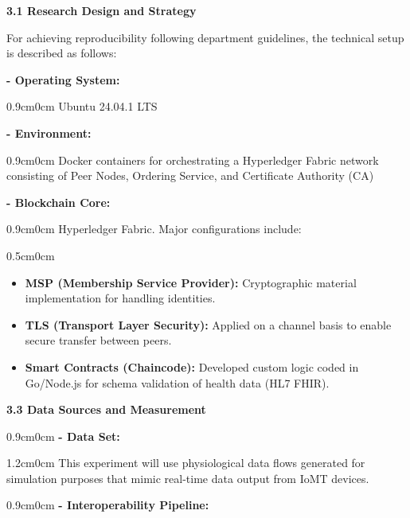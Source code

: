 \documentclass[12pt, a4paper]{report}
\begin{document}
\vspace{0.5cm}
{\color{myblue} \Large \bfseries 3.1 Research Design and Strategy}

\noindent For achieving reproducibility following department guidelines, the technical setup is described as follows:

\textbf{-	Operating System:}
\begin{adjustwidth}{0.9cm}{0cm}
   \vspace{-1.0em} 
   Ubuntu 24.04.1 LTS 
\end{adjustwidth}

\textbf{-	Environment:} 
\begin{adjustwidth}{0.9cm}{0cm}
\vspace{-1.0em} 
   Docker containers for orchestrating a Hyperledger Fabric network consisting of Peer Nodes, Ordering Service, and Certificate Authority (CA) 
\end{adjustwidth}

\textbf{-	Blockchain Core:} 
\begin{adjustwidth}{0.9cm}{0cm}
\vspace{-1.0em}
   Hyperledger Fabric. Major configurations include: 
\end{adjustwidth}

\begin{adjustwidth} {0.5cm}{0cm}
\vspace{-1.0em}
\begin{itemize}[nosep, topsep=0pt, partopsep=0pt]
    \item \textbf{MSP (Membership Service Provider):} Cryptographic material implementation for handling identities.
    \item \textbf{TLS (Transport Layer Security):} Applied on a channel basis to enable secure transfer between peers.
    \item \textbf{Smart Contracts (Chaincode):} Developed custom logic coded in Go/Node.js for schema validation of health data (HL7 FHIR).
\end{itemize}
\end{adjustwidth}


\vspace{1.8cm}
{\color{myblue} \Large \bfseries 3.3 Data Sources and Measurement}
\begin{adjustwidth}{0.9cm}{0cm}
  \textbf{-	Data Set:}  
\end{adjustwidth}

\begin{adjustwidth}{1.2cm}{0cm}
   \vspace{-1.0em} 
   This experiment will use physiological data flows generated for simulation purposes that mimic real-time data output from IoMT devices.
\end{adjustwidth}
\begin{adjustwidth}{0.9cm}{0cm}
    \textbf{-	Interoperability Pipeline:} 
\end{adjustwidth}
\end{document}
